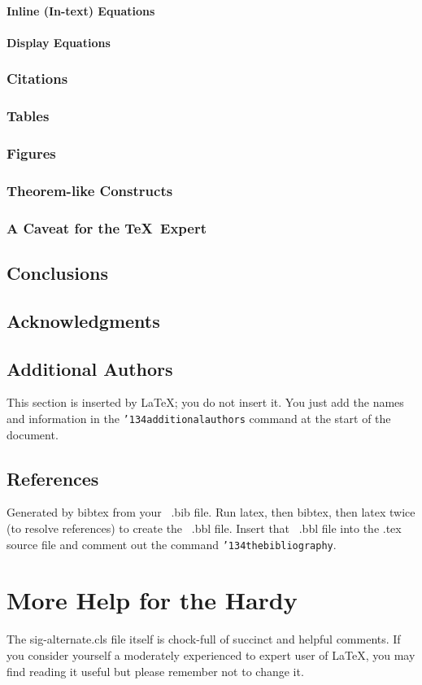 \documentclass{nime-alternate} %
\begin{document}
\paragraph{Inline (In-text) Equations}
\paragraph{Display Equations}
\subsubsection{Citations}
\subsubsection{Tables}
\subsubsection{Figures}
\subsubsection{Theorem-like Constructs}
\subsubsection*{A Caveat for the \TeX\ Expert}
\subsection{Conclusions}
\subsection{Acknowledgments}
\subsection{Additional Authors}
This section is inserted by \LaTeX; you do not insert it.
You just add the names and information in the
\texttt{{\char'134}additionalauthors} command at the start
of the document.
\subsection{References}
Generated by bibtex from your ~.bib file.  Run latex,
then bibtex, then latex twice (to resolve references)
to create the ~.bbl file.  Insert that ~.bbl file into
the .tex source file and comment out
the command \texttt{{\char'134}thebibliography}.

\section{More Help for the Hardy}
The sig-alternate.cls file itself is chock-full of succinct
and helpful comments.  If you consider yourself a moderately
experienced to expert user of \LaTeX, you may find reading
it useful but please remember not to change it.


\end{document}
